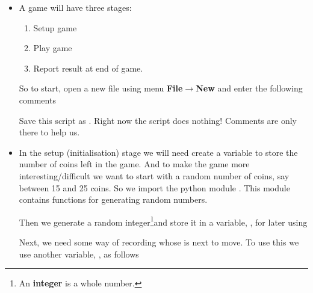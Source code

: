 \documentclass{coderdojo}
\begin{document}
\begin{itemize}
\item[\color{section!70!black}\larger\ding{43}] A game will have three stages:
\begin{enumerate}
\item Setup game
\item Play game
\item Report result at end of game.  
\end{enumerate}
So to start, open a new file using menu {\bfseries File$\to$New} and enter the following comments



Save this script as . Right now the script does nothing! Comments are only there to help us.

\item[\color{section!70!black}\larger\ding{43}] In the setup (initialisation) stage we will need create a variable to store the number of coins left in the game. And to make the game more interesting/difficult we want to start with a random number of coins, say between 15 and 25 coins. So we import the python module . This module contains functions for generating random numbers.


	
Then we generate a random integer\footnote{An {\bf integer} is a whole number.}and store it in a variable, , for later using



Next, we need some way of recording whose is next to move. To use this we use another variable, , as follows
	

\end{itemize}
\end{document}
